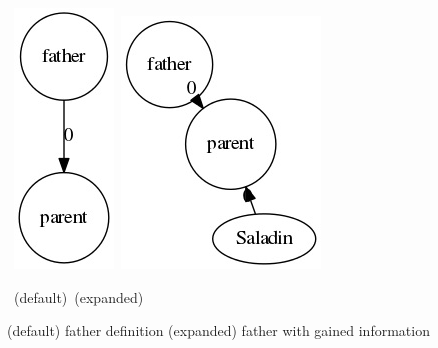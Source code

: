 \documentclass[twoside,b5paper,10pt]{article}
\begin{document}
\begin{figure}[htb]
  \vspace{3pt}
  \centerline{
  \hbox{
  \hspace{0.0in}
        \includegraphics[scale=0.5]{Figure/father.jpg}
        \hspace{0.1\columnwidth}
        \includegraphics[scale=0.5]{Figure/fathernew.jpg}
    }
  }
  \vspace{3pt}
  \hbox{\hspace{0.23\columnwidth} (default) \hspace{0.3\columnwidth} (expanded)}
  \caption{ (default) father definition (expanded) father with gained information}
  \label{fig:father}
\end{figure}
\end{document}
